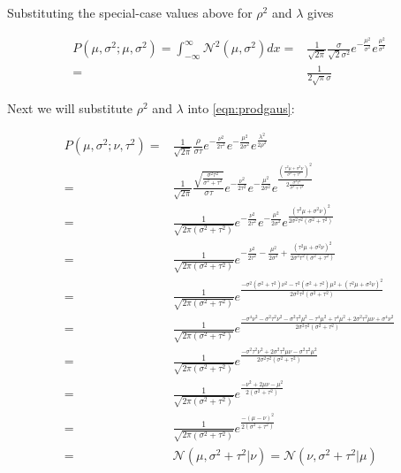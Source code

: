 \documentclass{article}
\begin{document}
Substituting the special-case values above for $\rho^2$ and $\lambda$ gives

\begin{equation}
\begin{aligned}
    P(\mu,\sigma^2;\mu,\sigma^2) = \int_{-\infty}^{\infty}\mathcal{N}^2(\mu, \sigma^2)dx = & \frac{1}{\sqrt{2\pi}}\frac{\sigma}{\sqrt{2}\sigma^2}e^{-\frac{\mu^2}{\sigma^2}}e^{\frac{\mu^2}{\sigma^2}} \\
    = & \frac{1}{2\sqrt{\pi}\sigma}
\end{aligned}
\end{equation}

Next we will substitute $\rho^2$ and $\lambda$ into \ref{eqn:prodgaus}:

\begin{equation}
    \begin{aligned}
P(\mu, \sigma^2; \nu, \tau^2) = & \frac{1}{\sqrt{2\pi}}\frac{\rho}{\sigma\tau} e^{-\frac{\nu^2}{2\tau^2}}e^{ - \frac{\mu^2}{2\sigma^2}}
    e^{\frac{\lambda^2}{2\rho^2}} \\
    = & \frac{1}{\sqrt{2\pi}} \frac{\sqrt{\frac{\sigma^2\tau^2}{\sigma^2+\tau^2}}}{\sigma\tau}e^{-\frac{\nu^2}{2\tau^2}}e^{ - \frac{\mu^2}{2\sigma^2}}e^{\frac{\left(\frac{\tau^2\mu+\sigma^2\nu}{\sigma^2+\tau^2} \right)^2}{2\frac{\sigma^2\tau^2}{\sigma^2+\tau^2}}} \\
    = & \frac{1}{\sqrt{2\pi\left( \sigma^2 + \tau^2 \right)}}e^{-\frac{\nu^2}{2\tau^2}}e^{ - \frac{\mu^2}{2\sigma^2}}e^{\frac{\left(\tau^2\mu + \sigma^2\nu \right)^2}{2\sigma^2\tau^2\left( \sigma^2 + \tau^2 \right)}} \\
    = & \frac{1}{\sqrt{2\pi\left( \sigma^2 + \tau^2 \right)}}e^{-\frac{\nu^2}{2\tau^2} - \frac{\mu^2}{2\sigma^2}+\frac{\left(\tau^2\mu + \sigma^2\nu \right)^2}{2\sigma^2\tau^2\left( \sigma^2 + \tau^2 \right)}} \\
    = & \frac{1}{\sqrt{2\pi\left( \sigma^2 + \tau^2 \right)}}e^{
        \frac{-\sigma^2\left(\sigma^2+\tau^2\right)\nu^2-\tau^2\left(\sigma^2+\tau^2\right)\mu^2+\left( \tau^2\mu + \sigma^2\nu \right)^2}{2\sigma^2\tau^2\left( \sigma^2+\tau^2 \right)}
    } \\
    = & \frac{1}{\sqrt{2\pi\left( \sigma^2 + \tau^2 \right)}}e^{
        \frac{-\sigma^4\nu^2-\sigma^2\tau^2\nu^2 - \sigma^2\tau^2\mu^2 - \tau^4\mu^2 + \tau^4\mu^2+2\sigma^2\tau^2\mu\nu+\sigma^4\nu^2}
             {2\sigma^2\tau^2\left( \sigma^2+\tau^2 \right)}
    } \\
    = & \frac{1}{\sqrt{2\pi\left( \sigma^2 + \tau^2 \right)}}e^{
        \frac{-\sigma^2\tau^2 \nu^2 + 2\sigma^2\tau^2 \mu \nu - \sigma^2\tau^2\mu^2}{2\sigma^2\tau^2\left(\sigma^2 + \tau^2 \right)} 
    } \\
    = & \frac{1}{\sqrt{2\pi\left( \sigma^2 + \tau^2 \right)}}e^{
        \frac{-\nu^2 + 2\mu \nu - \mu^2}{2\left(\sigma^2 + \tau^2 \right)} 
    } \\
    = & \frac{1}{\sqrt{2\pi\left( \sigma^2 + \tau^2 \right)}}e^{
        \frac{-(\mu - \nu)^2}{2\left(\sigma^2 + \tau^2 \right)} 
    } \\
    = & \mathcal{N}(\mu, \sigma^2+\tau^2| \nu) = \mathcal{N}(\nu, \sigma^2+\tau^2| \mu)
    \end{aligned}
\end{equation}
\end{document}
